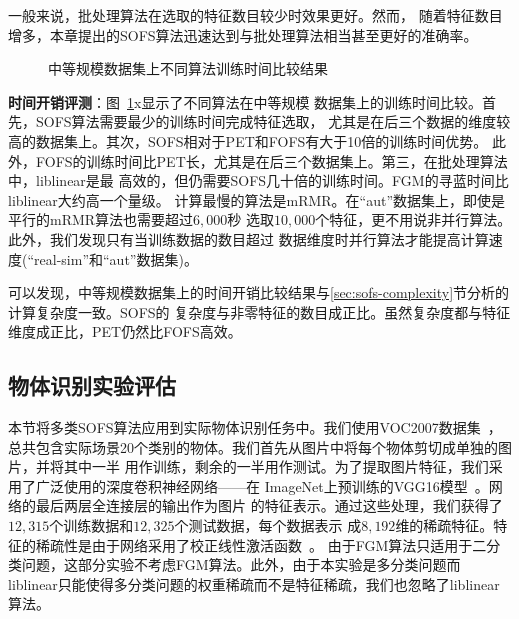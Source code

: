 一般来说，批处理算法在选取的特征数目较少时效果更好。然而，
随着特征数目增多，本章提出的SOFS算法迅速达到与批处理算法相当甚至更好的准确率。

\begin{figure}[ht]
    \centerline{
    }
    \centerline{
    }
    \centerline{
    }
    \caption{中等规模数据集上不同算法训练时间比较结果}
    \label{fig:sofs-medium-train-time-comp}
\end{figure}
\textbf{时间开销评测}：图~\ref{fig:sofs-medium-train-time-comp}x显示了不同算法在中等规模
数据集上的训练时间比较。首先，SOFS算法需要最少的训练时间完成特征选取，
尤其是在后三个数据的维度较高的数据集上。其次，SOFS相对于PET和FOFS有大于10倍的训练时间优势。
此外，FOFS的训练时间比PET长，尤其是在后三个数据集上。第三，在批处理算法中，liblinear是最
高效的，但仍需要SOFS几十倍的训练时间。FGM的寻蓝时间比liblinear大约高一个量级。
计算最慢的算法是mRMR。在``aut''数据集上，即使是平行的mRMR算法也需要超过$6,000$秒
选取$10,000$个特征，更不用说非并行算法。此外，我们发现只有当训练数据的数目超过
数据维度时并行算法才能提高计算速度(``real-sim''和``aut''数据集)。

可以发现，中等规模数据集上的时间开销比较结果与\ref{sec:sofs-complexity}节分析的计算复杂度一致。SOFS的
复杂度与非零特征的数目成正比。虽然复杂度都与特征维度成正比，PET仍然比FOFS高效。

\subsection{物体识别实验评估}
本节将多类SOFS算法应用到实际物体识别任务中。我们使用VOC2007数据集~\cite{pascal-voc-2007}，
总共包含实际场景20个类别的物体。我们首先从图片中将每个物体剪切成单独的图片，并将其中一半
用作训练，剩余的一半用作测试。为了提取图片特征，我们采用了广泛使用的深度卷积神经网络——在
ImageNet上预训练的VGG16模型~\cite{simonyan2014very}。网络的最后两层全连接层的输出作为图片
的特征表示。通过这些处理，我们获得了$12,315$个训练数据和$12,325$个测试数据，每个数据表示
成$8,192$维的稀疏特征。特征的稀疏性是由于网络采用了校正线性激活函数~\cite{krizhevsky2012imagenet}。
由于FGM算法只适用于二分类问题，这部分实验不考虑FGM算法。此外，由于本实验是多分类问题而
liblinear只能使得多分类问题的权重稀疏而不是特征稀疏，我们也忽略了liblinear算法。

